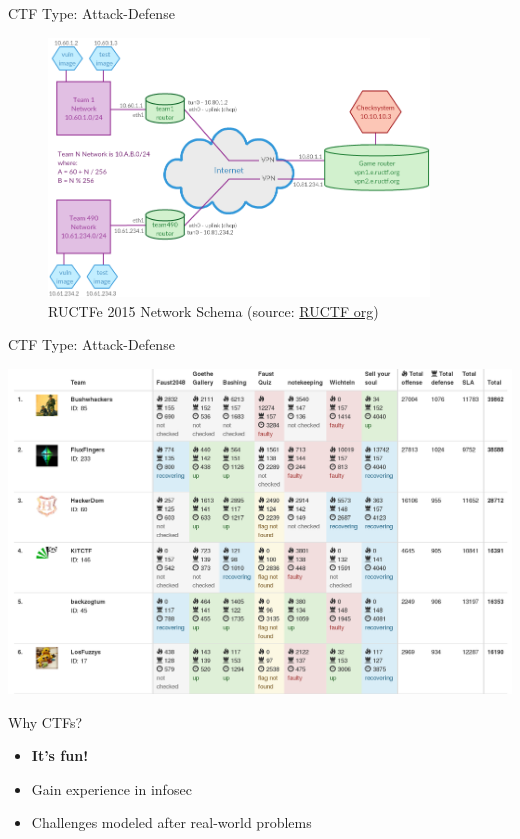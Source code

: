 \begin{frame}
  {CTF Type: Attack-Defense}

  \begin{figure}[h]
    \centering
    \includegraphics[width=0.9\textwidth]{./images/ructf-network.png}
    \caption{RUCTFe 2015 Network Schema (source:
      \href{https://ructf.org/e/2015/network.html}{RUCTF org}) }
  \end{figure}
\end{frame}
\begin{frame}
  {CTF Type: Attack-Defense}

  \begin{center}
    \includegraphics[width=\textwidth]{./images/faustctf-scoreboard.png}
  \end{center}

\end{frame}


\begin{frame}
  {Why CTFs?}

  \begin{itemize}
    \item \textbf{It's fun!}
    \item Gain experience in infosec
    \item Challenges modeled after real-world problems
  \end{itemize}
\end{frame}


